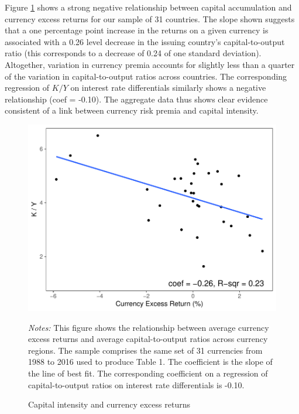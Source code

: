 \documentclass{ar-1col}
\begin{document}
Figure \ref{fig:ky_rx} shows a strong negative relationship between capital accumulation and currency excess returns for our sample of 31 countries. The slope shown suggests that a one percentage point increase in the returns on a given currency is associated with a 0.26 level decrease in the issuing country's capital-to-output ratio (this corresponds to a decrease of 0.24 of one standard deviation). Altogether, variation in currency premia accounts for slightly less than a quarter of the variation in capital-to-output ratios across countries. The corresponding regression of $K/Y$ on interest rate differentials similarly shows a negative relationship (coef = -0.10). The aggregate data thus shows clear evidence consistent of a link between currency risk premia and capital intensity. 
\begin{figure}[htp]
    \centering
    \caption{Capital intensity and currency excess returns}
    \label{fig:ky_rx}
    \includegraphics[width=0.7\linewidth]{Exhibits/Figure_KY_RX.pdf}
    \begin{minipage}[htp]{\textwidth}
    \scriptsize 
    \emph{Notes:} This figure shows the relationship between average currency excess returns and average capital-to-output ratios across currency regions. The sample comprises the same set of 31 currencies from 1988 to 2016 used to produce Table 1. The coefficient is the slope of the line of best fit. The corresponding coefficient on a regression of capital-to-output ratios on interest rate differentials is -0.10.
    \end{minipage}
\end{figure}
\end{document}
